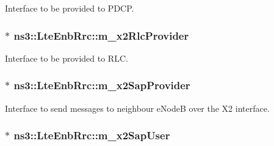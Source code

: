 Interface to be provided to P\+D\+CP. 

\subsubsection[{\texorpdfstring{m\+\_\+x2\+Rlc\+Provider}{m_x2RlcProvider}}]{$\ast$ ns3\+::\+Lte\+Enb\+Rrc\+::m\+\_\+x2\+Rlc\+Provider\hspace{0.3cm}{\ttfamily [private]}}\hypertarget{classns3_1_1LteEnbRrc_a12b5a146b24eee21ce4df43dd6512114}{}\label{classns3_1_1LteEnbRrc_a12b5a146b24eee21ce4df43dd6512114}


Interface to be provided to R\+LC. 

\subsubsection[{\texorpdfstring{m\+\_\+x2\+Sap\+Provider}{m_x2SapProvider}}]{$\ast$ ns3\+::\+Lte\+Enb\+Rrc\+::m\+\_\+x2\+Sap\+Provider\hspace{0.3cm}{\ttfamily [private]}}\hypertarget{classns3_1_1LteEnbRrc_ae8dc75f4f6f63b7736d86204a4beb415}{}\label{classns3_1_1LteEnbRrc_ae8dc75f4f6f63b7736d86204a4beb415}


Interface to send messages to neighbour e\+NodeB over the X2 interface. 

\subsubsection[{\texorpdfstring{m\+\_\+x2\+Sap\+User}{m_x2SapUser}}]{$\ast$ ns3\+::\+Lte\+Enb\+Rrc\+::m\+\_\+x2\+Sap\+User\hspace{0.3cm}{\ttfamily [private]}}\hypertarget{classns3_1_1LteEnbRrc_abe194d716748f1d4579731c60cd8022c}{}\label{classns3_1_1LteEnbRrc_abe194d716748f1d4579731c60cd8022c}


